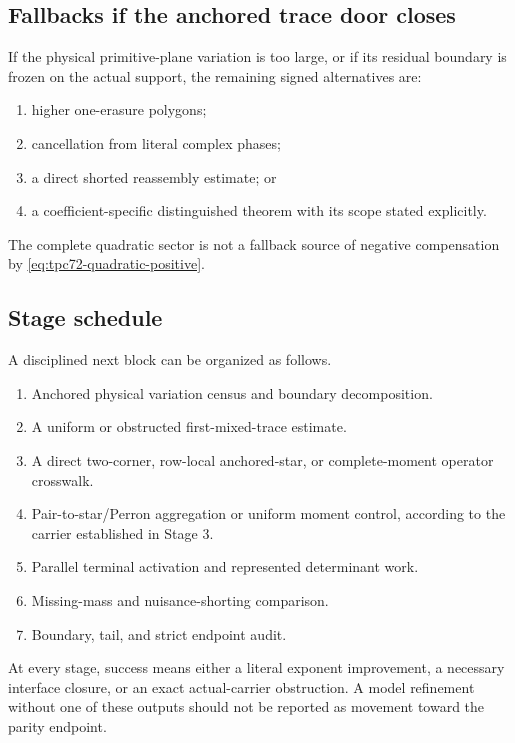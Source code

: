 \subsection{Fallbacks if the anchored trace door closes}

If the physical primitive-plane variation is too large, or if its residual
boundary is frozen on the actual support, the remaining signed alternatives
are:
\begin{enumerate}[label=\textup{(\roman*)},leftmargin=3em]
 \item higher one-erasure polygons;
 \item cancellation from literal complex phases;
 \item a direct shorted reassembly estimate; or
 \item a coefficient-specific distinguished theorem with its scope stated
       explicitly.
\end{enumerate}
The complete quadratic sector is not a fallback source of negative
compensation by \eqref{eq:tpc72-quadratic-positive}.

\subsection{Stage schedule}

A disciplined next block can be organized as follows.
\begin{enumerate}[label=\textbf{Stage \arabic*.},leftmargin=4.5em]
 \item Anchored physical variation census and boundary decomposition.
 \item A uniform or obstructed first-mixed-trace estimate.
 \item A direct two-corner, row-local anchored-star, or complete-moment
       operator crosswalk.
 \item Pair-to-star/Perron aggregation or uniform moment control, according
       to the carrier established in Stage 3.
 \item Parallel terminal activation and represented determinant work.
 \item Missing-mass and nuisance-shorting comparison.
 \item Boundary, tail, and strict endpoint audit.
\end{enumerate}
At every stage, success means either a literal exponent improvement, a
necessary interface closure, or an exact actual-carrier obstruction.  A
model refinement without one of these outputs should not be reported as
movement toward the parity endpoint.
